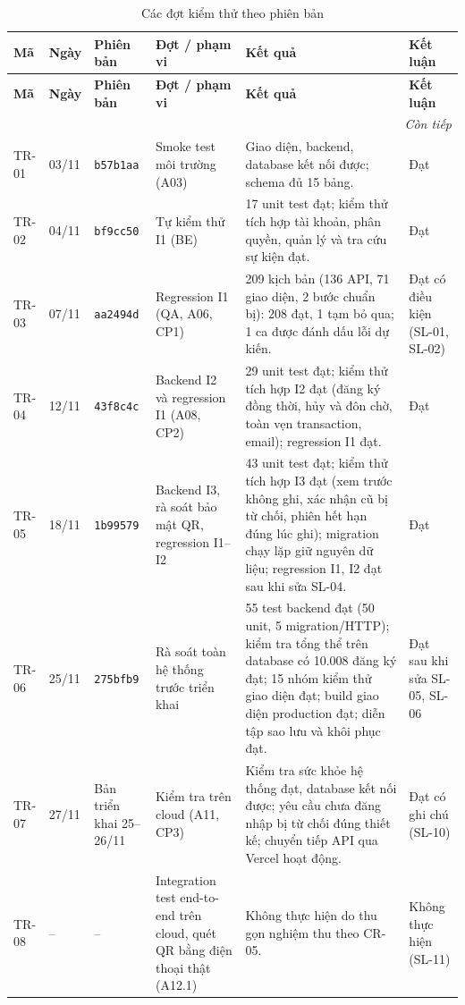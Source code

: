 \begingroup\footnotesize
\renewcommand{\arraystretch}{1.18}
\begin{longtable}{@{}p{.07\linewidth}p{.08\linewidth}p{.11\linewidth}p{.17\linewidth}p{.38\linewidth}p{.11\linewidth}@{}}
\caption{Các đợt kiểm thử theo phiên bản}\label{tab:tr-runs}\\
\toprule
\textbf{Mã} & \textbf{Ngày} & \textbf{Phiên bản} & \textbf{Đợt / phạm vi} & \textbf{Kết quả} & \textbf{Kết luận}\\\midrule\endfirsthead
\toprule
\textbf{Mã} & \textbf{Ngày} & \textbf{Phiên bản} & \textbf{Đợt / phạm vi} & \textbf{Kết quả} & \textbf{Kết luận}\\\midrule\endhead
\midrule\multicolumn{6}{r}{\textit{Còn tiếp}}\\\endfoot
\bottomrule\endlastfoot
TR-01 & 03/11 & \texttt{b57b1aa} & Smoke test môi trường (A03) & Giao diện, backend, database kết nối được; schema đủ 15 bảng. & Đạt\\
TR-02 & 04/11 & \texttt{bf9cc50} & Tự kiểm thử I1 (BE) & 17 unit test đạt; kiểm thử tích hợp tài khoản, phân quyền, quản lý và tra cứu sự kiện đạt. & Đạt\\
TR-03 & 07/11 & \texttt{aa2494d} & Regression I1 (QA, A06, CP1) & 209 kịch bản (136 API, 71 giao diện, 2 bước chuẩn bị): 208 đạt, 1 tạm bỏ qua; 1 ca được đánh dấu lỗi dự kiến. & Đạt có điều kiện (SL-01, SL-02)\\
TR-04 & 12/11 & \texttt{43f8c4c} & Backend I2 và regression I1 (A08, CP2) & 29 unit test đạt; kiểm thử tích hợp I2 đạt (đăng ký đồng thời, hủy và đôn chờ, toàn vẹn transaction, email); regression I1 đạt. & Đạt\\
TR-05 & 18/11 & \texttt{1b99579} & Backend I3, rà soát bảo mật QR, regression I1--I2 & 43 unit test đạt; kiểm thử tích hợp I3 đạt (xem trước không ghi, xác nhận cũ bị từ chối, phiên hết hạn đúng lúc ghi); migration chạy lặp giữ nguyên dữ liệu; regression I1, I2 đạt sau khi sửa SL-04. & Đạt\\
TR-06 & 25/11 & \texttt{275bfb9} & Rà soát toàn hệ thống trước triển khai & 55 test backend đạt (50 unit, 5 migration/HTTP); kiểm tra tổng thể trên database có 10.008 đăng ký đạt; 15 nhóm kiểm thử giao diện đạt; build giao diện production đạt; diễn tập sao lưu và khôi phục đạt. & Đạt sau khi sửa SL-05, SL-06\\
TR-07 & 27/11 & Bản triển khai 25--26/11 & Kiểm tra trên cloud (A11, CP3) & Kiểm tra sức khỏe hệ thống đạt, database kết nối được; yêu cầu chưa đăng nhập bị từ chối đúng thiết kế; chuyển tiếp API qua Vercel hoạt động. & Đạt có ghi chú (SL-10)\\
TR-08 & -- & -- & Integration test end-to-end trên cloud, quét QR bằng điện thoại thật (A12.1) & Không thực hiện do thu gọn nghiệm thu theo CR-05. & Không thực hiện (SL-11)\\
\end{longtable}
\endgroup

